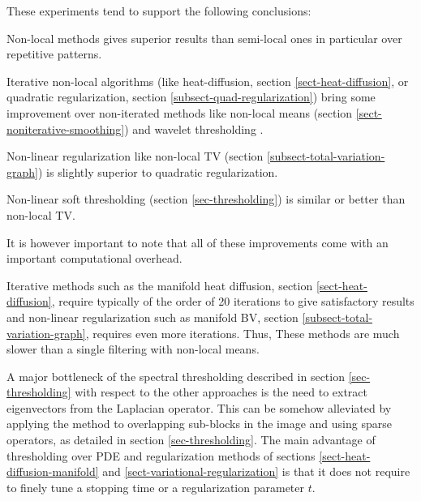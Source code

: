 \documentclass[final]{siamltex}
\begin{document}
These experiments tend to support the following conclusions:
\begin{rs}
	\item Non-local methods gives superior results than semi-local ones in particular over repetitive patterns. 
	\item Iterative non-local algorithms (like heat-diffusion, section \ref{sect-heat-diffusion}, or quadratic regularization, section \ref{subsect-quad-regularization}) bring some  improvement over non-iterated methods like non-local means (section \ref{sect-noniterative-smoothing}) and wavelet thresholding \cite{mallat-book}. 
	\item Non-linear regularization like non-local TV (section \ref{subsect-total-variation-graph}) is slightly superior to quadratic regularization.
	\item Non-linear soft thresholding (section \ref{sec-thresholding}) is similar or better than non-local TV.
\end{rs}
It is however important to note that all of these improvements come with an important computational overhead. 

Iterative methods such as the manifold heat diffusion, section \ref{sect-heat-diffusion}, require typically of the order of 20 iterations to give satisfactory results and non-linear regularization such as manifold BV, section \ref{subsect-total-variation-graph}, requires even more iterations. Thus, These methods are much slower than a single filtering with non-local means. 

A major bottleneck of the spectral thresholding described in section \ref{sec-thresholding} with respect to the other approaches is the need to extract eigenvectors from the Laplacian operator. This can be somehow alleviated by applying the method to overlapping sub-blocks in the image and using sparse operators, as detailed in section \ref{sec-thresholding}. The main advantage of thresholding over PDE and regularization methods of sections \ref{sect-heat-diffusion-manifold} and \ref{sect-variational-regularization} is that it does not require to finely tune a stopping time or a regularization parameter $t$.




\end{document}
